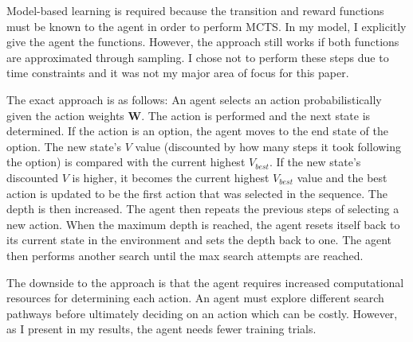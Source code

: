 Model-based learning is required because the transition and reward functions must be known to the agent in order to perform MCTS. In my model, I explicitly give the agent the functions. However, the approach still works if both functions are approximated through sampling. I chose not to perform these steps due to time constraints and it was not my major area of focus for this paper.


The exact approach is as follows: An agent selects an action probabilistically given the action weights \textbf{W}. The action is performed and the next state is determined. If the action is an option, the agent moves to the end state of the option. The new state's $V$ value (discounted by how many steps it took following the option) is compared with the current highest $V_{best}$. If the new state's discounted $V$ is higher, it becomes the current highest $V_{best}$ value and the best action is updated to be the first action that was selected in the sequence. The depth is then increased. The agent then repeats the previous steps of selecting a new action. When the maximum depth is reached, the agent resets itself back to its current state in the environment and sets the depth back to one. The agent then performs another search until the max search attempts are reached.

The downside to the approach is that the agent requires increased computational resources for determining each action. An agent must explore different search pathways before ultimately deciding on an action which can be costly. However, as I present in my results, the agent needs fewer training trials.


